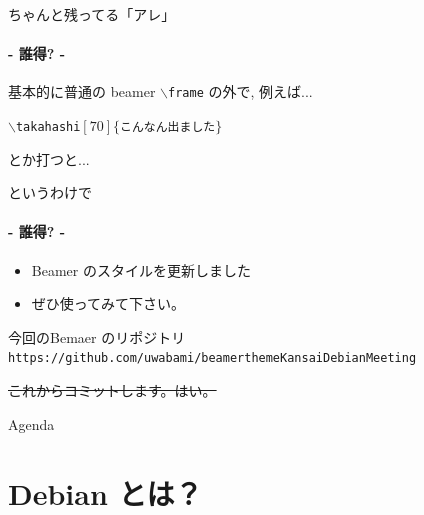 \documentclass[cjk,dvipdfmx,14pt,compress,fragile]{beamer}
\newcommand{\textfootnotesize}[1]{{\footnotesize{#1}}}
\begin{document}
\begin{frame}{ちゃんと残ってる「アレ」}
  \framesubtitle{- 誰得? -}
  \begin{block}{基本的に普通の beamer}
    $\backslash${\tt frame} の外で, 例えば...
    \begin{center}
      {\tt $\backslash$takahashi$[70]\{$こんなん出ました$\}$}
    \end{center}
    とか打つと...
  \end{block}

\end{frame}



\begin{frame}{というわけで}
  \framesubtitle{- 誰得? -}
  \begin{itemize}
  \item Beamer のスタイルを更新しました
  \item ぜひ使ってみて下さい。
  \end{itemize}
  \begin{block}{今回のBemaer のリポジトリ}
    \centering
    \textfootnotesize{\texttt{https://github.com/uwabami/beamerthemeKansaiDebianMeeting}}
  \end{block}
  \sout{これからコミットします。はい。}
\end{frame}


\begin{frame}{Agenda}
\tableofcontents
\end{frame}

\section{Debian とは？}
\end{document}
